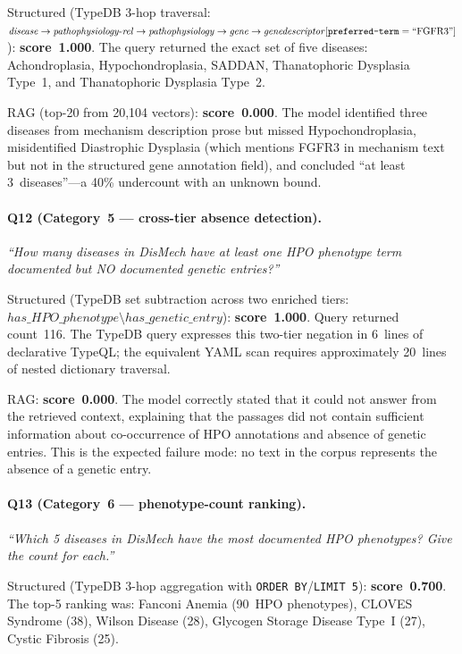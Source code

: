 Structured (TypeDB 3-hop traversal:
$\mathit{disease} \to \mathit{pathophysiology\text{-}rel} \to
\mathit{pathophysiology} \to \mathit{gene} \to
\mathit{genedescriptor}[\texttt{preferred\text{-}term}=\text{``FGFR3''}]$):
\textbf{score~1.000}. The query returned the exact set of five diseases:
Achondroplasia, Hypochondroplasia, SADDAN, Thanatophoric Dysplasia Type~1, and
Thanatophoric Dysplasia Type~2.

RAG (top-20 from 20{,}104 vectors): \textbf{score~0.000}. The model identified
three diseases from mechanism description prose but missed Hypochondroplasia,
misidentified Diastrophic Dysplasia (which mentions FGFR3 in mechanism text
but not in the structured gene annotation field), and concluded ``at least
3~diseases''---a 40\% undercount with an unknown bound.

\paragraph{Q12 (Category~5 --- cross-tier absence detection).}
\textit{``How many diseases in DisMech have at least one HPO phenotype term
documented but NO documented genetic entries?''}

Structured (TypeDB set subtraction across two enriched tiers:
$\mathit{has\_HPO\_phenotype} \setminus \mathit{has\_genetic\_entry}$):
\textbf{score~1.000}. Query returned count~116. The TypeDB query expresses this
two-tier negation in 6~lines of declarative TypeQL; the equivalent YAML scan
requires approximately 20~lines of nested dictionary traversal.

RAG: \textbf{score~0.000}. The model correctly stated that it could not answer
from the retrieved context, explaining that the passages did not contain
sufficient information about co-occurrence of HPO annotations and absence of
genetic entries. This is the expected failure mode: no text in the corpus
represents the absence of a genetic entry.

\paragraph{Q13 (Category~6 --- phenotype-count ranking).}
\textit{``Which 5 diseases in DisMech have the most documented HPO phenotypes?
Give the count for each.''}

Structured (TypeDB 3-hop aggregation with \texttt{ORDER~BY}/\texttt{LIMIT~5}):
\textbf{score~0.700}. The top-5 ranking was: Fanconi Anemia (90~HPO
phenotypes), CLOVES Syndrome (38), Wilson Disease (28), Glycogen Storage
Disease Type~I (27), Cystic Fibrosis (25).

